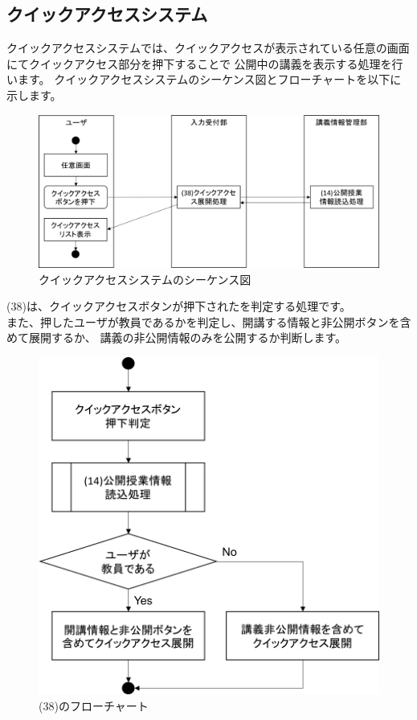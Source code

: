 \clearpage



\subsection{クイックアクセスシステム}
クイックアクセスシステムでは、クイックアクセスが表示されている任意の画面にてクイックアクセス部分を押下することで
公開中の講義を表示する処理を行います。
クイックアクセスシステムのシーケンス図とフローチャートを以下に示します。

\begin{figure}[htbp]
  \begin{center}
    \includegraphics[width=1\linewidth,clip]{./img/seq10.png}
    \caption{クイックアクセスシステムのシーケンス図}\label{fig:seq10}
  \end{center}
\end{figure}

(38)は、クイックアクセスボタンが押下されたを判定する処理です。\\
また、押したユーザが教員であるかを判定し、開講する情報と非公開ボタンを含めて展開するか、
講義の非公開情報のみを公開するか判断します。

\begin{figure}[htbp]
  \begin{center}
    \includegraphics[width=0.5\linewidth,clip]{./img/flow/38.png}
    \caption{(38)のフローチャート}\label{fig:38}
  \end{center}
\end{figure}



